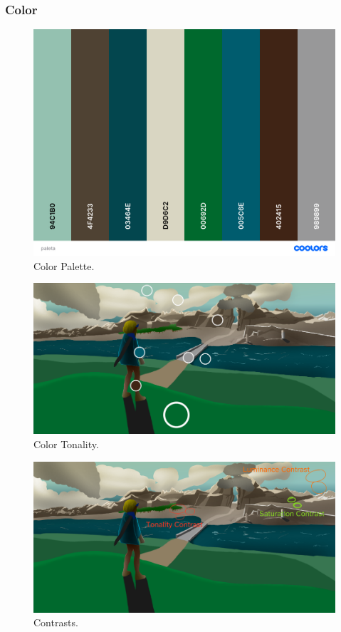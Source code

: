 \documentclass{cup-pan}
\begin{document}
        \subsubsection{Color}

            \begin{figure}[H]
                \includegraphics[width=\textwidth]{Imagenes/Fanart1/Analysis/paleta.png}
                \caption{Color Palette.}
            \end{figure}

            \begin{figure}[H]
                \includegraphics[width=\textwidth]{Imagenes/Fanart1/Analysis/tonalidad.png}
                \caption{Color Tonality.}
            \end{figure}

            \begin{figure}[H]
                \includegraphics[width=\textwidth]{Imagenes/Fanart1/Analysis/contraste.png}
                \caption{Contrasts.}
            \end{figure}
\end{document}
